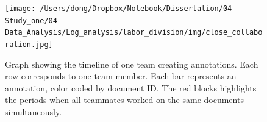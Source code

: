 \begin{figure}
\centering
\texttt{[image: /Users/dong/Dropbox/Notebook/Dissertation/04-Study\_one/04-Data\_Analysis/Log\_analysis/labor\_division/img/close\_collaboration.jpg]}
\caption{Graph showing the timeline of one team creating annotations.
Each row corresponds to one team member. Each bar represents an
annotation, color coded by document ID. The red blocks highlights the
periods when all teammates worked on the same documents
simultaneously.\label{fig:close_collaboration}}
\end{figure}
